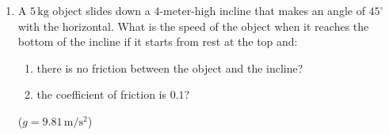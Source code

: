 \documentclass[12pt]{letter}
\begin{document}
\begin{enumerate}
For a stationary orbit, the orbital period of the satellite must be equal to the rotation period of Pluto:
$$T = 6.38723\,\mathrm{days}.$$

Converting this into seconds:
$$T=6.38723 \cdot 24 \cdot 3600\,s\approx 5.51857\cdot 10^{5}\,\mathrm{s}.$$

The gravitational force provides the centripetal force:
$$\frac{GM_ {Pluto}m}{r^2}=m\frac{4\pi^2r}{T^2}.$$

After simplifying and solving for the orbital radius:
$$r=\sqrt[3]{\frac{GM_{Pluto}T^2}{4\pi^2}}.$$

Substituting the data:
$$r=\sqrt[3]{\frac{(6.6743\cdot 10^{-11}\,Nm^{2}/kg^{2})(1.305\cdot 10^{22}\,kg)(5.51857\cdot 10^{5}\,s)^2}{4\pi^2}}.$$

$$r\approx1.88\cdot 10^{7}\,\mathrm{m}.$$

Therefore, the 
$$r \approx 1.88\cdot 10^{4}\,\mathrm{km}$$
from the center of Pluto.

Since the radius of Pluto is approximately
$$R_{\mathrm{Pluto}}\approx1188\,\mathrm{km},$$
the altitude above the surface is
$$h=r-R_{\mathrm{Pluto}}\approx1.88\cdot 10^{4}-1.19\cdot 10^{3}.$$

$$\boxed{h \approx 1.76\cdot 10^{4}\,\mathrm{km}}$$

\hfill (10~points)


\pagebreak
\item A $5\,\mathrm{kg}$ object slides down a $4$-meter-high incline that makes an angle of $45^\circ$ with the horizontal. What is the speed of the object when it reaches the bottom of the incline if it starts from rest at the top and:
\begin{enumerate}
    \item there is no friction between the object and the incline?
    \item the coefficient of friction is $0.1$? 
    \end{enumerate}
($g=9.81\,\mathrm{m/s^{2}}$)

\begin{center}
\end{center}
\end{enumerate}
\end{document}
